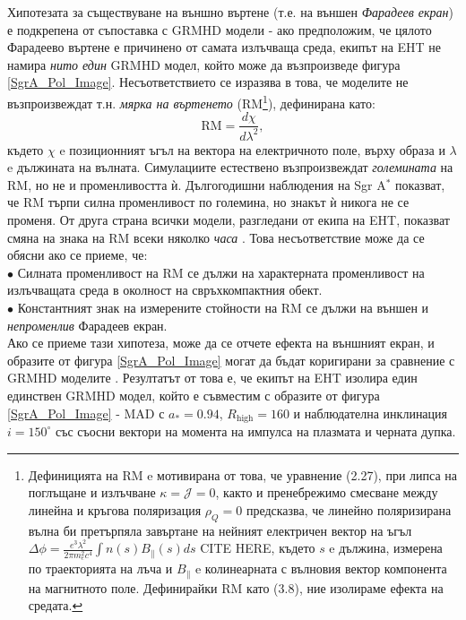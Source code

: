 Хипотезата за съществуване на външно въртене (т.е. на външен \emph{Фарадеев екран}) е подкрепена от съпоставка с GRMHD модели - ако предположим, че цялото Фарадеево въртене е причинено от самата излъчваща среда, екипът на EHT не намира \emph{нито един} GRMHD модел, който може да възпроизведе фигура \ref{SgrA_Pol_Image}. Несъответствието се изразява в това, че моделите не възпроизвеждат т.н. \emph{мярка на въртенето} (RM\footnote{
	Дефиницията на RM e мотивирана от това, че уравнение (2.27), при липса на поглъщане и излъчване $\kappa = \mathcal{J} = 0$, както и пренебрежимо смесване между линейна и кръгова поляризация $\rho_Q = 0$ предсказва, че линейно поляризирана вълна би претърпяла завъртане на нейният електричен вектор на ъгъл $\Delta\phi = \frac{e^3\lambda^2}{2\pi m_e^2 c^4}\int n(s)B_\parallel(s) ds$ CITE HERE, където $s$ e дължина, измерена по траекторията на лъча и $B_\parallel$ e колинеарната с вълновия вектор компонента на магнитното поле. Дефинирайки RM като (3.8), ние изолираме ефекта на средата.
	}), дефинирана като:
\begin{equation}
	\text{RM} = \frac{d\chi}{d\lambda^2},
\end{equation}
където $\chi$ e позиционният ъгъл на вектора на електричното поле, върху образа и $\lambda$ e дължината на вълната. Симулациите естествено възпроизвеждат \emph{големината} на RM, но не и променливостта ѝ. Дългогодишни наблюдения на Sgr A$^*$ показват, че RM търпи силна променливост по големина, но знакът ѝ никога не се променя. От друга страна всички модели, разгледани от екипа на EHT, показват смяна на знака на RM всеки няколко \emph{часа} \cite{EHT_SGR_VIII}. Това несъответствие може да се обясни ако се приеме, че:\\\newline
$\bullet$ Силната променливост на RM се дължи на характерната променливост на излъчващата среда в околност на свръхкомпактния обект.\\\newline
$\bullet$ Константният знак на измерените стойности на RM се дължи на външен и \emph{непроменлив} Фарадеев екран.\\

Ако се приеме тази хипотеза, може да се отчете ефекта на външният екран, и образите от фигура \ref{SgrA_Pol_Image} могат да бъдат коригирани за сравнение с GRMHD моделите \cite{EHT_SGR_VIII}. Резултатът от това е, че екипът на EHT изолира един единствен GRMHD модел, който е съвместим с образите от фигура \ref{SgrA_Pol_Image} - MAD с $a_* = 0.94$, $R_\text{high} = 160$ и наблюдателна инклинация $i = 150^\circ$ със съосни вектори на момента на импулса на плазмата и черната дупка.